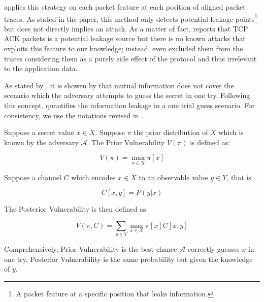 \cite{PinpointWeb} applies this strategy on each packet feature at each position of aligned packet traces. As stated in the paper, this method only detects potential leakage points\footnote{A packet feature at a specific position that leaks information.} but does not directly implies an attack. As a matter of fact, \cite{PinpointWeb} reports that TCP ACK packets is a potential leakage source but there is no known attacks that exploits this feature to our knowledge; instead, \cite{PClassifier} even excluded them from the traces considering them as a purely side effect of the protocol and thus irrelevant to the application data.

As stated by \cite{OneTryGuess}, it is showen by \cite{OneTryGuessOrigin} that mutual information does not cover the scenario which the adversary attempts to guess the secret in one try. Following this concept, \cite{OneTryGuess} quantifies the information leakage in a one trial guess scenario. For consistency, we use the notations revised in \cite{GLeakage}. 

\begin{definition}
	Suppose a secret value $x \in X$. Suppose $\pi$ the prior distribution of $X$ which is known by the adversary $\mathcal{A}$. The Prior Vulnerability $V(\pi)$ is defined as:
	
	\begin{equation}
		V(\pi) = \max_{x \in X}{\pi[x]}
	\end{equation}
	
	Suppose a channel $C$ which encodes $x \in X$ to an observable value $y \in Y$, that is
	
	\begin{equation}
		C[x,y] = P(y | x)
	\end{equation}
	
	The Posterior Vulnerability is then defined as:
	
	\begin{equation}
		V(\pi, C) = \sum_{y \in Y}{\max_{x \in X}{\pi[x]C[x,y]}} 
	\end{equation}
	
\end{definition}

Comprehensively, Prior Vulnerability is the best chance  $\mathcal{A}$ correctly guesses $x$ in one try. Posterior Vulnerability is the same probability but given the knowledge of $y$. 

